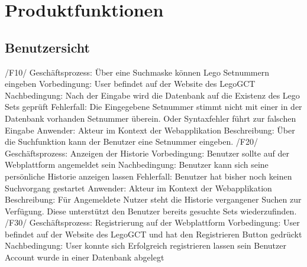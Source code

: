 \section{Produktfunktionen}

\subsection{Benutzersicht}
/F10/\newline
Geschäftsprozess: Über eine Suchmaske können Lego Setnummern eingeben\newline
Vorbedingung: User befindet auf der Website des LegoGCT\newline
Nachbedingung: Nach der Eingabe wird die Datenbank auf die Existenz des Lego Sets geprüft\newline
Fehlerfall: Die Eingegebene Setnummer stimmt nicht mit einer in der Datenbank vorhanden Setnummer überein. Oder Syntaxfehler führt zur falschen Eingabe\newline
Anwender: Akteur im Kontext der Webapplikation\newline
Beschreibung: Über die Suchfunktion kann der Benutzer eine Setnummer eingeben.\newline\newline
/F20/\newline
Geschäftsprozess: Anzeigen der Historie\newline
Vorbedingung: Benutzer sollte auf der Webplattform angemeldet sein\newline
Nachbedingung: Benutzer kann sich seine persönliche Historie anzeigen lassen\newline
Fehlerfall: Benutzer hat bisher noch keinen Suchvorgang gestartet\newline
Anwender: Akteur im Kontext der Webapplikation\newline
Beschreibung: Für Angemeldete Nutzer steht die Historie vergangener Suchen zur Verfügung. Diese unterstützt den Benutzer bereits gesuchte Sets wiederzufinden.\newline\newline
/F30/\newline
Geschäftsprozess: Registrierung auf der Webplattform\newline
Vorbedingung: User befindet auf der Website des LegoGCT und hat den Registrieren Button gedrückt\newline
Nachbedingung: User konnte sich Erfolgreich registrieren lassen sein Benutzer Account wurde in einer Datenbank abgelegt\newline
